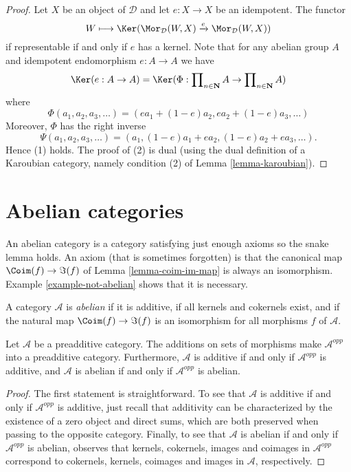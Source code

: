 \begin{proof}
Let $X$ be an object of $\mathcal{D}$ and let $e : X \to X$ be an idempotent.
The functor
$$
W \longmapsto \Ker(
\Mor_\mathcal{D}(W, X)
\xrightarrow{e}
\Mor_\mathcal{D}(W, X)
)
$$
if representable if and only if $e$ has a kernel. Note that for any
abelian group $A$ and idempotent endomorphism $e : A \to A$ we have
$$
\Ker(e : A \to A)
= \Ker(\Phi :
\prod\nolimits_{n \in \mathbf{N}} A
\to
\prod\nolimits_{n \in \mathbf{N}} A
)
$$
where
$$
\Phi(a_1, a_2, a_3, \ldots) = (ea_1 + (1 - e)a_2, ea_2 + (1 - e)a_3, \ldots)
$$
Moreover, $\Phi$ has the right inverse
$$
\Psi(a_1, a_2, a_3, \ldots) =
(a_1, (1 - e)a_1 + ea_2, (1 - e)a_2 + ea_3, \ldots).
$$
Hence (1) holds. The proof of (2) is dual (using the dual definition
of a Karoubian category, namely condition (2) of
Lemma \ref{lemma-karoubian}).
\end{proof}









\section{Abelian categories}
\label{section-abelian-categories}

\noindent
An abelian category is a category satisfying just enough axioms so the
snake lemma holds. An axiom (that is sometimes forgotten)
is that the canonical map $\Coim(f) \to \Im(f)$
of Lemma \ref{lemma-coim-im-map} is always an isomorphism.
Example \ref{example-not-abelian} shows that it is necessary.

\begin{definition}
\label{definition-abelian-category}
A category $\mathcal{A}$ is {\it abelian} if
it is additive, if all kernels and cokernels exist,
and if the natural map $\Coim(f) \to \Im(f)$
is an isomorphism for all morphisms $f$ of
$\mathcal{A}$.
\end{definition}

\begin{lemma}
\label{lemma-abelian-opposite}
Let $\mathcal{A}$ be a preadditive category.
The additions on sets of morphisms make
$\mathcal{A}^{opp}$ into a preadditive category.
Furthermore, $\mathcal{A}$ is additive if and only if $\mathcal{A}^{opp}$
is additive, and
$\mathcal{A}$ is abelian if and only if $\mathcal{A}^{opp}$ is abelian.
\end{lemma}

\begin{proof}
The first statement is straightforward.
To see that $\mathcal{A}$ is additive if and only if $\mathcal{A}^{opp}$
is additive, just recall that additivity can be characterized by
the existence of a zero object and direct sums, which are both
preserved when passing to the opposite category.
Finally, to see that
$\mathcal{A}$ is abelian if and only if $\mathcal{A}^{opp}$ is abelian,
observes that kernels, cokernels, images and coimages in
$\mathcal{A}^{opp}$ correspond to
cokernels, kernels, coimages and images in $\mathcal{A}$,
respectively.
\end{proof}

